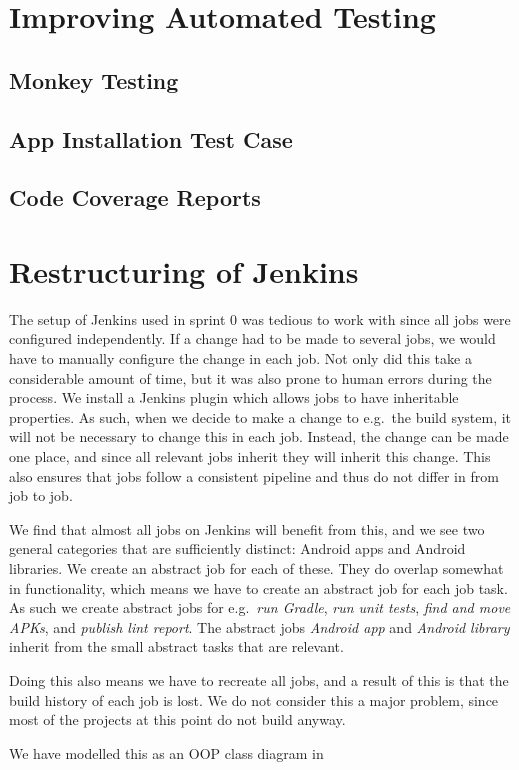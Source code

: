 
\chapter{Improving Automated Testing}
\section{Monkey Testing}
\section{App Installation Test Case}
\section{Code Coverage Reports}


\chapter{Restructuring of Jenkins}
The setup of Jenkins used in sprint 0 was tedious to work with since all jobs were configured independently. If a change had to be made to several jobs, we would have to manually configure the change in each job. Not only did this take a considerable amount of time, but it was also prone to human errors during the process. We install a Jenkins plugin which allows jobs to have inheritable properties. As such, when we decide to make a change to e.g.\ the build system, it will not be necessary to change this in each job. Instead, the change can be made one place, and since all relevant jobs inherit they will inherit this change. This also ensures that jobs follow a consistent pipeline and thus do not differ in from job to job.

We find that almost all jobs on Jenkins will benefit from this, and we see two general categories that are sufficiently distinct: Android apps and Android libraries. We create an abstract job for each of these. They do overlap somewhat in functionality, which means we have to create an abstract job for each job task. As such we create abstract jobs for e.g.\ \emph{run Gradle}, \emph{run unit tests}, \emph{find and move APKs}, and \emph{publish lint report}. The abstract jobs \emph{Android app} and \emph{Android library} inherit from the small abstract tasks that are relevant.

Doing this also means we have to recreate all jobs, and a result of this is that the build history of each job is lost. We do not consider this a major problem, since most of the projects at this point do not build anyway.

We have modelled this as an OOP class diagram in 





